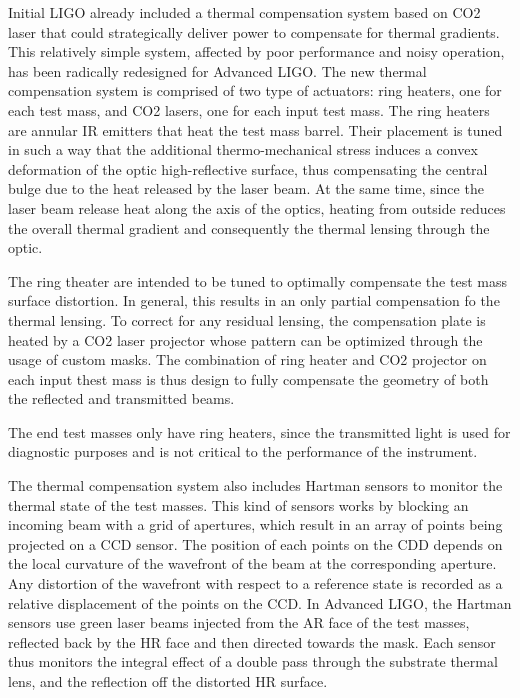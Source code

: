 Initial LIGO already included a thermal compensation system based on CO2 laser that could strategically deliver power to compensate for thermal gradients. This relatively simple system, affected by poor performance and noisy operation, has been radically redesigned for Advanced LIGO. The new thermal compensation system is comprised of two type of actuators: ring heaters, one for each test mass, and CO2 lasers, one for each input test mass. The ring heaters are annular IR emitters that heat the test mass barrel. Their placement is tuned in such a way that the additional thermo-mechanical stress induces a convex deformation of the optic high-reflective surface, thus compensating the central bulge due to the heat released by the laser beam. At the same time, since the laser beam release heat along the axis of the optics, heating from outside reduces the overall thermal gradient and consequently the thermal lensing through the optic.

The ring theater are intended to be tuned to optimally compensate the test mass surface distortion. In general, this results in an only partial compensation fo the thermal lensing. To correct for any residual lensing, the compensation plate is heated by a CO2 laser projector whose pattern can be optimized through the usage of custom masks. The combination of ring heater and CO2 projector on each input thest mass is thus design to fully compensate the geometry of both the reflected and transmitted beams.

The end test masses only have ring heaters, since the transmitted light is used for diagnostic purposes and is not critical to the performance of the instrument.

The thermal compensation system also includes Hartman sensors to monitor the thermal state of the test masses. This kind of sensors works by blocking an incoming beam with a grid of apertures, which result in an array of points being projected on a CCD sensor. The position of each points on the CDD depends on the local curvature of the wavefront of the beam at the corresponding aperture. Any distortion of the wavefront with respect to a reference state is recorded as a relative displacement of the points on the CCD.
In Advanced LIGO, the Hartman sensors use green laser beams injected from the AR face of the test masses, reflected back by the HR face and then directed towards the mask. Each sensor thus monitors the integral effect of a double pass through the substrate thermal lens, and the reflection off the distorted HR surface.

